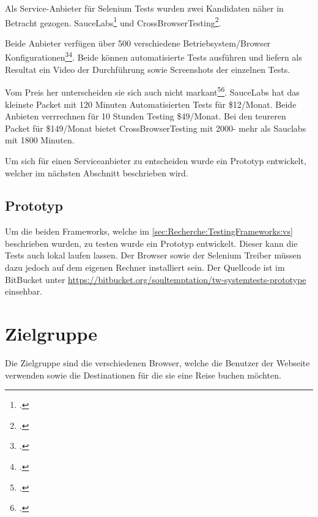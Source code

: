 Als Service-Anbieter für Selenium Tests wurden zwei Kandidaten näher in Betracht gezogen. SauceLabs\footcite{Sauce_Labs_2015-07-26} und CrossBrowserTesting\footcite{Cross_Browser_Testing_2015-07-26}.

Beide Anbieter verfügen über 500 verschiedene Betriebsystem/Browser Konfigurationen\footcite{Platforms_2015-07-26}\footcite{OS_Browser_Configurations_for_Cross_Browser_Compatibility_Testing_2015-07-26}. Beide können automatisierte Tests ausführen und liefern als Resultat ein Video der Durchführung sowie Screenshots der einzelnen Tests.

Vom Preis her unterscheiden sie sich auch nicht markant\footcite{Sauce_Labs_Pricing_2015-07-26}\footcite{Test_your_site_on_all_browsers_2015-07-26}. SauceLabs hat das kleinste Packet mit 120 Minuten Automatisierten Tests für \$12/Monat. Beide Anbieten verrrechnen für 10 Stunden Testing \$49/Monat. Bei den teureren Packet für \$149/Monat bietet CrossBrowserTesting mit 2000- mehr als Sauclabs mit 1800 Minuten.

Um sich für einen Serviceanbieter zu entscheiden wurde ein Prototyp entwickelt, welcher im nächsten Abschnitt beschrieben wird.

\subsection{Prototyp}
Um die beiden Frameworks, welche im \cref{sec:Recherche:TestingFrameworks:vs}  beschrieben wurden, zu testen wurde ein Prototyp entwickelt. Dieser kann die Tests auch lokal laufen lassen. Der Browser sowie der Selenium Treiber müssen dazu jedoch auf dem eigenen Rechner installiert sein. Der Quellcode ist im BitBucket unter \url{https://bitbucket.org/soultemptation/tw-systemtests-prototype} einsehbar.

\section{Zielgruppe}
Die Zielgruppe sind die verschiedenen Browser, welche die Benutzer der Webseite verwenden sowie die Destinationen für die sie eine Reise buchen möchten.

